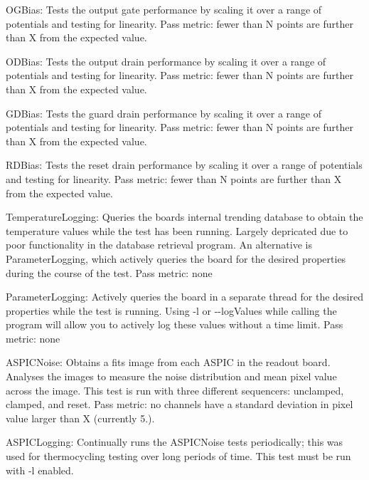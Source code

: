 \begin{DoxyItemize}
\item {\ttfamily O\+G\+Bias}\+: Tests the output gate performance by scaling it over a range of potentials and testing for linearity. Pass metric\+: fewer than N points are further than X from the expected value.
\item {\ttfamily O\+D\+Bias}\+: Tests the output drain performance by scaling it over a range of potentials and testing for linearity. Pass metric\+: fewer than N points are further than X from the expected value.
\item {\ttfamily G\+D\+Bias}\+: Tests the guard drain performance by scaling it over a range of potentials and testing for linearity. Pass metric\+: fewer than N points are further than X from the expected value.
\item {\ttfamily R\+D\+Bias}\+: Tests the reset drain performance by scaling it over a range of potentials and testing for linearity. Pass metric\+: fewer than N points are further than X from the expected value.
\item {\ttfamily Temperature\+Logging}\+: Queries the board\textquotesingle{}s internal trending database to obtain the temperature values while the test has been running. Largely depricated due to poor functionality in the database retrieval program. An alternative is {\ttfamily Parameter\+Logging}, which actively queries the board for the desired properties during the course of the test. Pass metric\+: none
\item {\ttfamily Parameter\+Logging}\+: Actively queries the board in a separate thread for the desired properties while the test is running. Using {\ttfamily -\/l} or {\ttfamily -\/-\/log\+Values} while calling the program will allow you to actively log these values without a time limit. Pass metric\+: none
\item {\ttfamily A\+S\+P\+I\+C\+Noise}\+: Obtains a fits image from each A\+S\+P\+IC in the readout board. Analyses the images to measure the noise distribution and mean pixel value across the image. This test is run with three different sequencers\+: unclamped, clamped, and reset. Pass metric\+: no channels have a standard deviation in pixel value larger than X (currently 5.).
\item {\ttfamily A\+S\+P\+I\+C\+Logging}\+: Continually runs the A\+S\+P\+I\+C\+Noise tests periodically; this was used for thermocycling testing over long periods of time. This test must be run with {\ttfamily -\/l} enabled.
\end{DoxyItemize}

